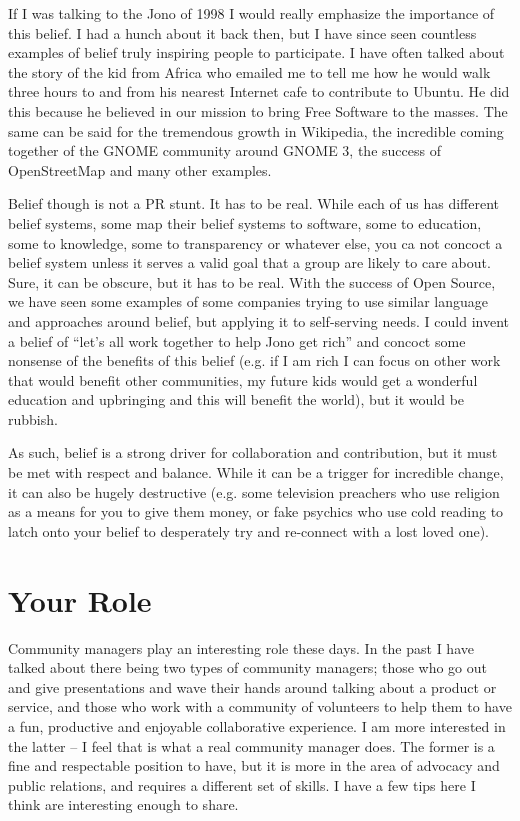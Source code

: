 If I was talking to the Jono of 1998 I would really emphasize the importance of this belief. I had a hunch about it back then, but I have since seen countless examples of belief truly inspiring people to participate. I have often talked about the story of the kid from Africa who emailed me to tell me how he would walk three hours to and from his nearest Internet cafe to contribute to Ubuntu. He did this because he believed in our mission to bring Free Software to the masses. The same can be said for the tremendous growth in Wikipedia, the incredible coming together of the GNOME community around GNOME 3, the success of OpenStreetMap and many other examples.

Belief though is not a PR stunt. It has to be real. While each of us has different belief systems, some map their belief systems to software, some to education, some to knowledge, some to transparency or whatever else, you ca not concoct a belief system unless it serves a valid goal that a group are likely to care about. Sure, it can be obscure, but it has to be real. With the success of Open Source, we have seen some examples of some companies trying to use similar language and approaches around belief, but applying it to self-serving needs. I could invent a belief of ``let’s all work together to help Jono get rich'' and concoct some nonsense of the benefits of this belief (e.g. if I am rich I can focus on other work that would benefit other communities, my future kids would get a wonderful education and upbringing and this will benefit the world), but it would be rubbish.

As such, belief is a strong driver for collaboration and contribution, but it must be met with respect and balance. While it can be a trigger for incredible change, it can also be hugely destructive (e.g. some television preachers who use religion as a means for you to give them money, or fake psychics who use cold reading to latch onto your belief to desperately try and re-connect with a lost loved one).

\section*{Your Role}

Community managers play an interesting role these days. In the past I have talked about there being two types of community managers; those who go out and give presentations and wave their hands around talking about a product or service, and those who work with a community of volunteers to help them to have a fun, productive and enjoyable collaborative experience. I am more interested in the latter -- I feel that is what a real community manager does. The former is a fine and respectable position to have, but it is more in the area of advocacy and public relations, and requires a different set of skills. I have a few tips here I think are interesting enough to share.

